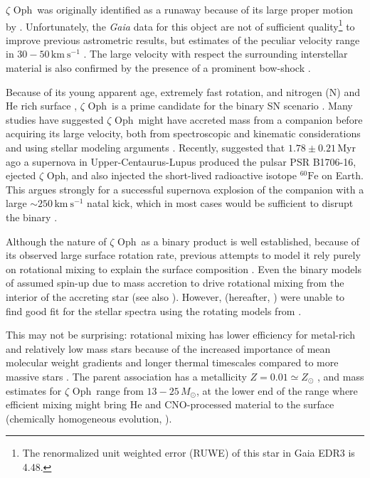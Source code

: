 \documentclass[twocolumn,twocolappendix,trackchanges]{aastex63}
\newcommand{\kms}{{\mathrm{km\ s^{-1}}}}
\newcommand{\zoph}{$\zeta$ Oph}
\begin{document}
\zoph\ was originally
identified as a runaway because of its large proper motion by
\cite{blaauw:52}. Unfortunately, the \emph{Gaia} data for this object
are not of sufficient quality\footnote{The renormalized unit weighted
  error (RUWE) of this star in Gaia EDR3 is 4.48.} to improve previous astrometric results,
but estimates of the peculiar velocity range in $30-50\,\kms$
\citep[e.g.,][]{zehe:18, neuhauser:20}. The large velocity with
respect the surrounding interstellar material is also confirmed by the
presence of a prominent bow-shock \citep[e.g.,][]{bodensteiner:18}.

Because of its young apparent age, extremely fast rotation, and nitrogen
(N) and He rich surface \citep[e.g.,][]{herrero:92, blaauw:93,
  villamariz:05, marcolino:09}, \zoph\ is a prime candidate for the
binary SN scenario \citep{blaauw:93}. Many studies have suggested
\zoph\ might have accreted mass from a companion before acquiring its
large velocity, both from spectroscopic and kinematic considerations
\citep[e.g.,][]{blaauw:93, hoogerwerf:00, hoogerwerf:01, tetzlaff:10,
  neuhauser:20} and using stellar modeling arguments
\citep[e.g.,][]{vanrensbergen:96}. Recently, \cite{neuhauser:20}
suggested that $1.78\pm0.21$\,Myr ago a supernova in
Upper-Centaurus-Lupus produced the pulsar PSR B1706-16, ejected \zoph,
and also injected the short-lived radioactive isotope
$^{60}\mathrm{Fe}$ on Earth. This argues strongly for a successful
supernova explosion of the companion with a large $\sim 250\,\kms$ natal
kick, which in most cases would be sufficient to disrupt the binary
\citep[e.g.,][]{tauris:15, renzo:19walk, evans:20}.

Although the nature of \zoph\ as a binary product is well established,
because of its observed large surface rotation rate, previous attempts
to model it rely purely on rotational mixing to explain the surface
composition \cite[e.g.,][]{maeder:00}. Even the binary models of
\cite{vanrensbergen:96} assumed spin-up due to mass accretion to drive
rotational mixing from the interior of the accreting star (see also
\citealt{cantiello:07}). However, \cite{villamariz:05} (hereafter,
) were unable to find good fit for the
stellar spectra using the rotating models from \cite{meynet:00, meynet:03}.

This may not be surprising: rotational mixing has lower efficiency for
metal-rich and relatively low mass stars because of the increased
importance of mean molecular weight gradients and longer thermal
timescales compared to more massive stars \citep[e.g.,][]{yoon:06,
  perna:14}. The parent association has a metallicity
$Z=0.01\simeq Z_\odot$ \citep[based on asteroseismology
from][]{murphy:21}, and mass estimates for \zoph\ range from
$13-25\,M_\odot$, at the lower end of the range where efficient mixing
might bring He and CNO-processed material to the surface (chemically
homogeneous evolution, \citealt{maeder:00}).
\end{document}
